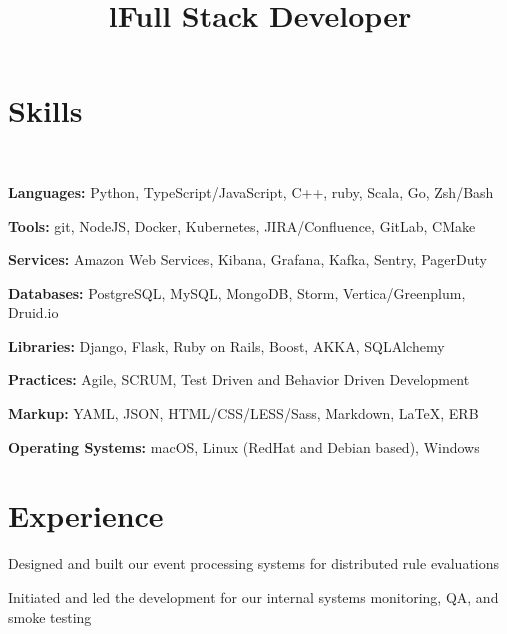 \documentclass[12pt, tweaklist, line]{res}
\title{l}\dates{r}\\
\let\tempone\itemize
\let\temptwo\enditemize
\renewenvironment{itemize}{\tempone\vspace{-.15in}\setlength{\topsep}{0pt}\setlength{\itemsep}{3pt}\vspace{-.15in}}{\temptwo}
\def\Cplusplus{C++}
\begin{document}

\begin{resume}

\section{Skills}

~\\ %

\begin{itemize}
\item \textbf{Languages:} Python, TypeScript/JavaScript, \Cplusplus, ruby, Scala, Go, Zsh/Bash
\item \textbf{Tools:} git, NodeJS, Docker, Kubernetes, JIRA/Confluence, GitLab, CMake
\item \textbf{Services:} Amazon Web Services, Kibana, Grafana, Kafka, Sentry, PagerDuty
\item \textbf{Databases:} PostgreSQL, MySQL, MongoDB, Storm, Vertica/Greenplum, Druid.io
\item \textbf{Libraries:} Django, Flask, Ruby on Rails, Boost, AKKA, SQLAlchemy
\item \textbf{Practices:} Agile, SCRUM, Test Driven and Behavior Driven Development
\item \textbf{Markup:} YAML, JSON, HTML/CSS/LESS/Sass, Markdown, \LaTeX, ERB
\item \textbf{Operating Systems:} macOS, Linux (RedHat and Debian based), Windows
\end{itemize}

\section{Experience}

\title{Full Stack Developer}
\begin{position}
\begin{itemize}
\item Designed and built our event processing systems for distributed rule evaluations
\item Initiated and led the development for our internal systems monitoring, QA, and smoke testing
\end{itemize}
\end{position}


\end{resume}
\end{document}
